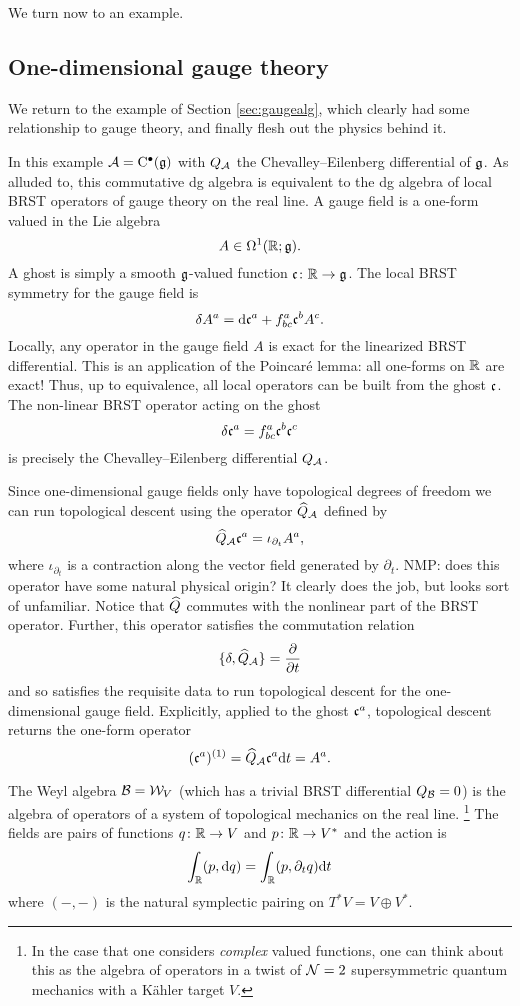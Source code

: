\documentclass[11pt]{amsart}
\def\natalie#1{{\textcolor{green!65!black}{NMP: {#1}}}}
\begin{document}
We turn now to an example. 

\subsection{One-dimensional gauge theory}
\label{sec:gaugetheory}

We return to the example of Section \ref{sec:gaugealg}, which clearly had some relationship to gauge theory, and finally flesh out the physics behind it. 

In this example $\cA = \clie^\bu(\fg)$ with $Q_{\cA}$ the Chevalley--Eilenberg differential of $\fg$.
As alluded to, this commutative dg algebra is equivalent to the dg algebra of local BRST operators of gauge theory on the real line. 
A gauge field is a one-form valued in the Lie algebra
\[
A \in \Omega^1(\RR ; \fg) .
\]
A ghost is simply a smooth $\fg$-valued function $\fc \colon \RR \to \fg$. 
The local BRST symmetry for the gauge field is
\[
\delta A^a = \d \fc^a + f_{bc}^a \fc^b A^c .
\]
Locally, any operator in the gauge field $A$ is exact for the linearized BRST differential. This is an application of the Poincar\'e lemma: all one-forms on $\RR$ are exact!
Thus, up to equivalence, all local operators can be built from the ghost $\fc$. 
The non-linear BRST operator acting on the ghost 
\[
\delta \fc^a = f_{bc}^a \fc^b \fc^c 
\]
is precisely the Chevalley--Eilenberg differential $Q_\cA$.

Since one-dimensional gauge fields only have topological degrees of freedom we can run topological descent using the operator $\Hat{Q}_\cA$ defined by
\[
\Hat{Q}_\cA \fc^a = \iota_{\partial_t} A^a ,
\] where $ \iota_{\partial_t}$ is a contraction along the vector field generated by $\partial_t$. \natalie{does this operator have some natural physical origin? It clearly does the job, but looks sort of unfamiliar.}
Notice that $\Hat{Q}$ commutes with the nonlinear part of the BRST operator. 
Further, this operator satisfies the commutation relation 
\[
\{\delta , \Hat{Q}_\cA\} = \frac{\partial}{\partial t} 
\]
and so satisfies the requisite data to run topological descent for the one-dimensional gauge field. 
Explicitly, applied to the ghost $\fc^a$, topological descent returns the one-form operator 
\[
(\fc^a)^{(1)} = \Hat{Q}_\cA \fc^a \d t = A^a  .
\]

The Weyl algebra $\cB = \cW_V$ (which has a trivial BRST differential $Q_{\cB} = 0$) is the algebra of operators of a system of topological mechanics on the real line. \footnote{In the case that one considers {\em complex} valued functions, one can think about this as the algebra of operators in a twist of $\cN=2$ supersymmetric quantum mechanics with a K\"ahler target $V$.}
The fields are pairs of functions $q  \colon \RR \to V$ and $p \colon \RR \to V^*$ and the action is 
\[
\int_\RR (p,\d q) = \int_\RR (p , \partial_t q) \d t 
\]
where $(-,-)$ is the natural symplectic pairing on $T^* V = V \oplus V^*$. 
\end{document}
